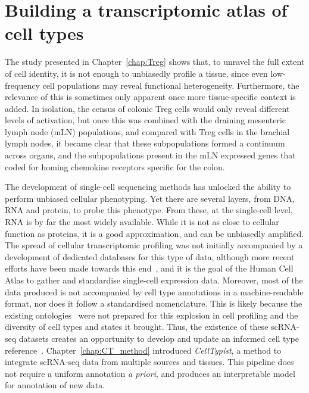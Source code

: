 \section{Building a transcriptomic atlas of cell types}
\label{section_atlas}
The study presented in Chapter~\ref{chap:Treg} shows that, to unravel the full extent of cell identity, it is not enough to unbiasedly profile a tissue, since even low-frequency cell populations may reveal functional heterogeneity. Furthermore, the relevance of this is sometimes only apparent once more tissue-specific context is added. In isolation, the census of colonic Treg cells would only reveal different levels of activation, but once this was combined with the draining mesenteric lymph node (mLN) populations, and compared with Treg cells in the brachial lymph nodes, it became clear that these subpopulations formed a continuum across organs, and the subpopulations present in the mLN expressed genes that coded for homing chemokine receptors specific for the colon.

The development of single-cell sequencing methods has unlocked the ability to perform unbiased cellular phenotyping. Yet there are several layers, from DNA, RNA and protein, to probe this phenotype. From these, at the single-cell level, RNA is by far the most widely available. While it is not as close to cellular function as proteins, it is a good approximation, and can be unbiasedly amplified. The spread of cellular transcriptomic profiling was not initially accompanied by a development of dedicated databases for this type of data, although more recent efforts have been made towards this end~\citep{alavi_web_2018,franzen_panglaodb:_2019}, and it is the goal of the Human Cell Atlas to gather and standardise single-cell expression data. Moreover, most of the data produced is not accompanied by cell type annotations in a machine-readable format, nor does it follow a standardised nomenclature. This is likely because the existing ontologies~\citep{bard_ontology_2005} were not prepared for this explosion in cell profiling and the diversity of cell types and states it brought. Thus, the existence of these scRNA-seq datasets creates an opportunity to develop and update an informed cell type reference~\citep{aevermann_cell_2018}. Chapter~\ref{chap:CT_method} introduced \textit{CellTypist}, a method to integrate scRNA-seq data from multiple sources and tissues. This pipeline does not require a uniform annotation \textit{a priori}, and produces an interpretable model for annotation of new data.

